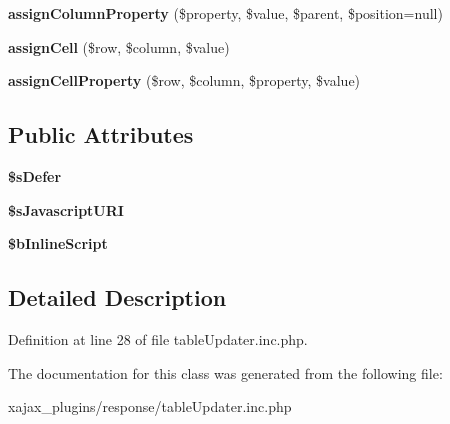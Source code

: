 \begin{DoxyCompactItemize}
\item 
\hypertarget{classclsTableUpdater_a66881754399c9946c71afcb6d7ee690b}{
{\bfseries assignColumnProperty} (\$property, \$value, \$parent, \$position=null)}
\label{classclsTableUpdater_a66881754399c9946c71afcb6d7ee690b}

\item 
\hypertarget{classclsTableUpdater_a5d02247d9814134ecc438296b394dafc}{
{\bfseries assignCell} (\$row, \$column, \$value)}
\label{classclsTableUpdater_a5d02247d9814134ecc438296b394dafc}

\item 
\hypertarget{classclsTableUpdater_a1afbd4e1b8bbb03cedf2f1fc26070162}{
{\bfseries assignCellProperty} (\$row, \$column, \$property, \$value)}
\label{classclsTableUpdater_a1afbd4e1b8bbb03cedf2f1fc26070162}

\end{DoxyCompactItemize}
\subsection*{Public Attributes}
\begin{DoxyCompactItemize}
\item 
\hypertarget{classclsTableUpdater_abfaa8bf19fbf69237272dc3dab99dfd4}{
{\bfseries \$sDefer}}
\label{classclsTableUpdater_abfaa8bf19fbf69237272dc3dab99dfd4}

\item 
\hypertarget{classclsTableUpdater_a543d12fbeeb5b311daf88e89377bb030}{
{\bfseries \$sJavascriptURI}}
\label{classclsTableUpdater_a543d12fbeeb5b311daf88e89377bb030}

\item 
\hypertarget{classclsTableUpdater_ac8c373f573bd3e5d4ce031682dd7a0b2}{
{\bfseries \$bInlineScript}}
\label{classclsTableUpdater_ac8c373f573bd3e5d4ce031682dd7a0b2}

\end{DoxyCompactItemize}


\subsection{Detailed Description}


Definition at line 28 of file tableUpdater.inc.php.



The documentation for this class was generated from the following file:\begin{DoxyCompactItemize}
\item 
xajax\_\-plugins/response/tableUpdater.inc.php\end{DoxyCompactItemize}
